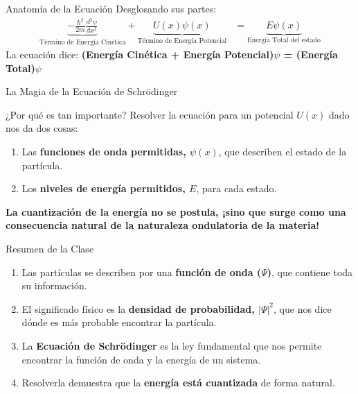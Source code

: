 \documentclass[12pt,aspectratio=169]{beamer}
\begin{document}
\begin{frame}{Anatomía de la Ecuación}
	Desglosando sus partes:
	\begin{align*}
		\underbrace{-\frac{\hbar^2}{2m} \frac{d^2\psi}{dx^2}}_{\text{Término de Energía Cinética}} + \underbrace{U(x)\psi(x)}_{\text{Término de Energía Potencial}} &= \underbrace{E\psi(x)}_{\text{Energía Total del estado}}
	\end{align*}
	\vspace{1em}
	La ecuación dice: \textbf{(Energía Cinética + Energía Potencial)$\psi$ = (Energía Total)$\psi$}
\end{frame}

\begin{frame}{La Magia de la Ecuación de Schrödinger}
	\begin{block}{¿Por qué es tan importante?}
		Resolver la ecuación para un potencial $U(x)$ dado nos da dos cosas:
		\begin{enumerate}
			\item Las \textbf{funciones de onda permitidas, $\psi(x)$}, que describen el estado de la partícula.
			\item Los \textbf{niveles de energía permitidos, $E$}, para cada estado.
		\end{enumerate}
	\end{block}
	\pause
	\begin{alertblock}{}
		\centering
		\textbf{La cuantización de la energía no se postula, ¡sino que surge como una consecuencia natural de la naturaleza ondulatoria de la materia!}
	\end{alertblock}
\end{frame}

\begin{frame}{Resumen de la Clase}
	\begin{enumerate}
		\item Las partículas se describen por una \textbf{función de onda ($\Psi$)}, que contiene toda su información.
		\item El significado físico es la \textbf{densidad de probabilidad, $|\Psi|^2$}, que nos dice dónde es más probable encontrar la partícula.
		\item La \textbf{Ecuación de Schrödinger} es la ley fundamental que nos permite encontrar la función de onda y la energía de un sistema.
		\item Resolverla demuestra que la \textbf{energía está cuantizada} de forma natural.
	\end{enumerate}
\end{frame}
\end{document}
